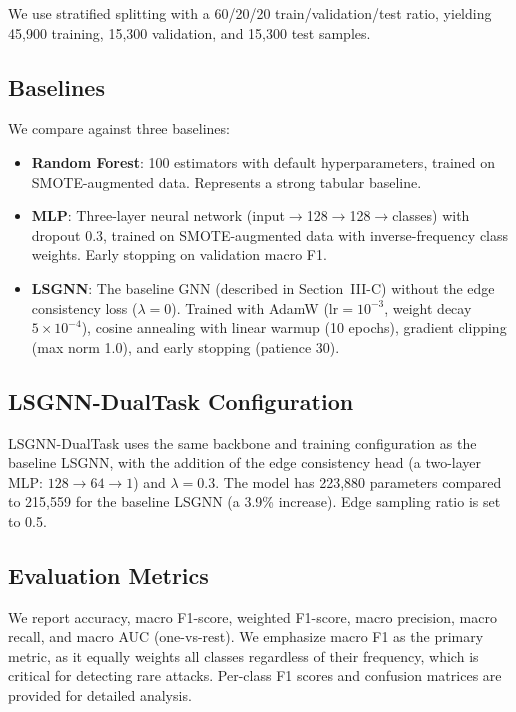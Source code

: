 \documentclass[conference]{IEEEtran}
\begin{document}
We use stratified splitting with a 60/20/20 train/validation/test ratio, yielding 45{,}900 training, 15{,}300 validation, and 15{,}300 test samples.

\subsection{Baselines}

We compare against three baselines:
\begin{itemize}
    \item \textbf{Random Forest}: 100 estimators with default hyperparameters, trained on SMOTE-augmented data. Represents a strong tabular baseline.
    \item \textbf{MLP}: Three-layer neural network (input$\rightarrow$128$\rightarrow$128$\rightarrow$classes) with dropout 0.3, trained on SMOTE-augmented data with inverse-frequency class weights. Early stopping on validation macro F1.
    \item \textbf{LSGNN}: The baseline GNN (described in Section~III-C) without the edge consistency loss ($\lambda = 0$). Trained with AdamW ($\text{lr}=10^{-3}$, weight decay $5 \times 10^{-4}$), cosine annealing with linear warmup (10 epochs), gradient clipping (max norm 1.0), and early stopping (patience 30).
\end{itemize}

\subsection{LSGNN-DualTask Configuration}

LSGNN-DualTask uses the same backbone and training configuration as the baseline LSGNN, with the addition of the edge consistency head (a two-layer MLP: $128 \rightarrow 64 \rightarrow 1$) and $\lambda = 0.3$. The model has 223{,}880 parameters compared to 215{,}559 for the baseline LSGNN (a 3.9\% increase). Edge sampling ratio is set to 0.5.

\subsection{Evaluation Metrics}

We report accuracy, macro F1-score, weighted F1-score, macro precision, macro recall, and macro AUC (one-vs-rest). We emphasize macro F1 as the primary metric, as it equally weights all classes regardless of their frequency, which is critical for detecting rare attacks. Per-class F1 scores and confusion matrices are provided for detailed analysis.
\end{document}
